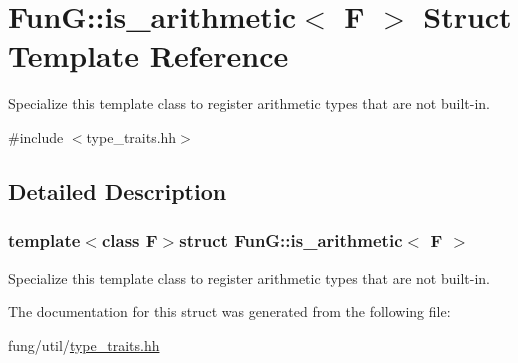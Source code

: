 \hypertarget{structFunG_1_1is__arithmetic}{\section{\-Fun\-G\-:\-:is\-\_\-arithmetic$<$ \-F $>$ \-Struct \-Template \-Reference}
\label{structFunG_1_1is__arithmetic}
}


\-Specialize this template class to register arithmetic types that are not built-\/in.  




{\ttfamily \#include $<$type\-\_\-traits.\-hh$>$}



\subsection{\-Detailed \-Description}
\subsubsection*{template$<$class F$>$struct Fun\-G\-::is\-\_\-arithmetic$<$ F $>$}

\-Specialize this template class to register arithmetic types that are not built-\/in. 

\-The documentation for this struct was generated from the following file\-:\begin{DoxyCompactItemize}
\item 
fung/util/\hyperlink{type__traits_8hh}{type\-\_\-traits.\-hh}\end{DoxyCompactItemize}
